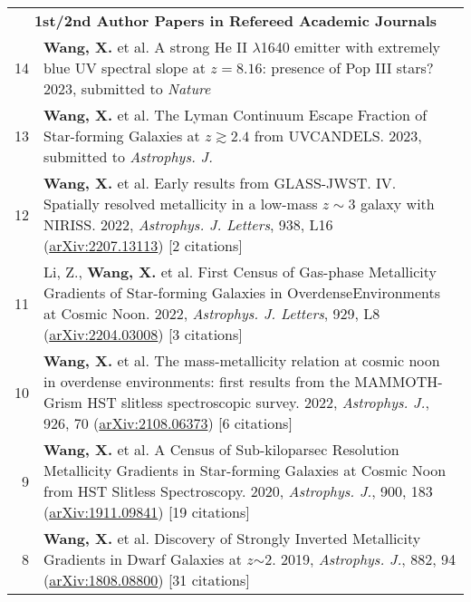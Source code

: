 \documentclass[letterpaper,10pt]{article}
\begin{document}
\begingroup
\renewcommand\arraystretch{1.2}
\vspace*{-.5em}
\begin{longtable}{rp{6.3in}}

\multicolumn{2}{c}{\textbf{1st/2nd Author Papers in Refereed Academic Journals}}      \\

14 &  \textbf{Wang, X.} et al. A strong He II $\lambda$1640 emitter with extremely blue UV spectral slope at $z=8.16$: presence of Pop III stars? 2023, submitted to \textit{Nature}    \\

13 &  \textbf{Wang, X.} et al. The Lyman Continuum Escape Fraction of Star-forming Galaxies at $z\gtrsim2.4$ from UVCANDELS. 2023, submitted to \textit{Astrophys. J.}  \\

12 &  \textbf{Wang, X.} et al. Early results from GLASS-JWST. IV. Spatially resolved metallicity in a low-mass $z\sim3$ galaxy with NIRISS. 2022, \textit{Astrophys. J. Letters}, 938, L16 (\href{https://arxiv.org/abs/2207.13113}{arXiv:2207.13113}) [2 citations] \\

11 &  Li, Z., \textbf{Wang, X.} et al. First Census of Gas-phase Metallicity Gradients of Star-forming Galaxies in OverdenseEnvironments at Cosmic Noon. 2022, \textit{Astrophys. J. Letters}, 929, L8 (\href{https://arxiv.org/abs/2204.03008}{arXiv:2204.03008}) [3 citations] \\

10 &  \textbf{Wang, X.} et al. The mass-metallicity relation at cosmic noon in overdense environments: first results from the MAMMOTH-Grism HST slitless spectroscopic survey. 2022, \textit{Astrophys. J.}, 926, 70 (\href{https://arxiv.org/abs/2108.06373}{arXiv:2108.06373}) [6 citations] \\

9 &  \textbf{Wang, X.} et al. A Census of Sub-kiloparsec Resolution Metallicity Gradients in Star-forming Galaxies at Cosmic Noon from HST Slitless Spectroscopy. 2020, \textit{Astrophys. J.}, 900, 183 (\href{https://arxiv.org/abs/1911.09841}{arXiv:1911.09841}) [19 citations] \\

8 &  \textbf{Wang, X.} et al. Discovery of Strongly Inverted Metallicity Gradients in Dwarf Galaxies at $z$$\sim$2. 2019, \textit{Astrophys. J.}, 882, 94 (\href{https://arxiv.org/abs/1808.08800}{arXiv:1808.08800}) [31 citations]  \\


\end{longtable}
\end{document}
